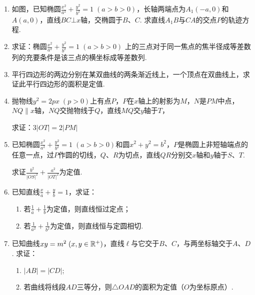 \begin{enumerate}
\begin{minipage}{.4\textwidth}
\begin{tikzpicture}[>=stealth, scale=.6]
\end{tikzpicture}    
\end{minipage}\hfill
\begin{minipage}{.57\textwidth}
    \centering
{}    
\end{minipage}

\item 如图，已知椭圆$\frac{x^2}{a^2}+\frac{y^2}{b^2}=1\; (a>b>0)$，长轴两端点为$A_1(-a,0)$和$A(a,0)$，直线$BC\bot x$轴，交椭圆于$B$、$C$. 求直线$A_1B$与$CA$的交点$P$的轨迹方程.
\item 求证：椭圆$\frac{x^2}{a^2}+\frac{y^2}{b^2}=1\; (a>b>0)$
上的三点对于同一焦点的焦半径成等差数列的充要条件是该三点的横坐标成等差数列.
\item 平行四边形的两边分别在某双曲线的两条渐近线上，一个顶点在双曲线上，求证此平行四边形的面积是定值.
\item 抛物线$y^2=2px\; (p>0)$上有点$P$，$P$在$x$轴上的射影为$M$，$N$是$PM$中点，$NQ\parallel x$轴，$NQ$交抛物线于$Q$，直线$MQ$交$y$轴于$T$，

求证：$3|OT|=2|PM|$
\item 已知椭圆$\frac{x^2}{a^2}+\frac{y^2}{b^2}=1\; (a>b>0)$和圆$x^2+y^2=b^2$，$P$是椭圆上非短轴端点的任意一点，过$P$作圆的切线，$Q$、$R$为切点，直线$QR$分别交$x$轴和$y$轴于$S$、$T$. 

求证$\frac{b^2}{|OS|^2}+\frac{a^2}{|OT|^2}$为定值.
\item 已知直线$\frac{x}{a}+\frac{y}{b}=1$，求证：
\begin{enumerate}[(1)]
\item 若$\frac{1}{a}+\frac{1}{b}$为定值，则直线恒过定点；
\item 若$\frac{1}{a^2}+\frac{1}{b^2}$为定值，则直线恒与定圆相切.
\end{enumerate}

\item 已知曲线$xy=m^2\; (x,y\in\mathbb{R}^+)$，直线$\ell$与它交于$B$、$C$，与两坐标轴交于$A$、$D$. 求证：
\begin{enumerate}[(1)]
\item $|AB|=|CD|$;
\item 若曲线将线段$AD$三等分，则$\triangle OAD$的面积为定值（$O$为坐标原点）.
\end{enumerate}


\end{enumerate}
